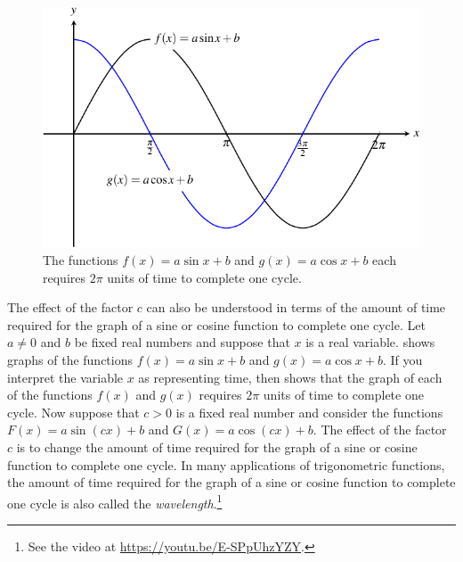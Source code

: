 \documentclass[a4paper,oneside,12pt]{article}
\begin{document}
\begin{figure}[!htbp]
\centering
\includegraphics[scale=1.1]{image/13/sin-cos-cycle-default.pdf}
\caption{%
  The functions $f(x) = a \sin x + b$ and $g(x) = a \cos x + b$ each
  requires $2\pi$ units of time to complete one cycle.
}
\label{fig:trigonometric:sine_cosine_one_cycle}
\end{figure}

The effect of the factor $c$ can also be understood in terms of the
amount of time required for the graph of a sine or cosine function to
complete one cycle.  Let $a \neq 0$ and $b$ be fixed real numbers and
suppose that $x$ is a real variable.
 shows graphs of the
functions $f(x) = a \sin x + b$ and $g(x) = a \cos x + b$.  If you
interpret the variable $x$ as representing time, then
 shows that the graph
of each of the functions $f(x)$ and $g(x)$ requires $2\pi$ units of
time to complete one cycle.  Now suppose that $c > 0$ is a fixed real
number and consider the functions $F(x) = a \sin(cx) + b$ and
$G(x) = a \cos(cx) + b$.  The effect of the factor $c$ is to change
the amount of time required for the graph of a sine or cosine function
to complete one cycle.  In many applications of trigonometric
functions, the amount of time required for the graph of a sine or
cosine function to complete one cycle is also called the
\emph{wavelength}.\footnote{
  See the video at
  \url{https://youtu.be/E-SPpUhzYZY}.
}
\end{document}
